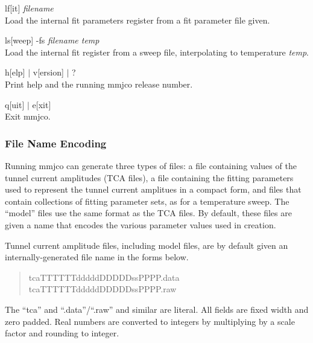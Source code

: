 {\begin{description}
\item{{\vt lf}[{\vt it}] {\it filename}\\
Load the internal fit parameters register from a fit parameter file
given.}

\item{{\vt ls}[{\vt weep}] {\vt -fs} {\it filename temp}\\
Load the internal fit register from a sweep file, interpolating to
temperature {\it temp}.}

\item{{\vt h}[{\vt elp}] $|$ {\vt v}[{\vt ersion}] $|$ ?\\
Print help and the running mmjco release number.}

\item{{\vt q}[{\vt uit}] $|$ {\vt e}[{\vt xit}]\\
Exit {\vt mmjco}.}
\end{description}

\subsubsection{File Name Encoding}

Running {\vt mmjco} can generate three types of files:  a file
containing values of the tunnel current amplitudes (TCA files), a file
containing the fitting parameters used to represent the tunnel current
amplitues in a compact form, and files that contain collections of
fitting parameter sets, as for a temperature sweep.  The ``model''
files use the same format as the TCA files.  By default, these files
are given a name that encodes the various parameter values used in
creation.

Tunnel current amplitude files, including model files, are by default
given an internally-generated file name in the forms below.
\begin{quote}\vt
tcaTTTTTTdddddDDDDDssPPPP.data\\
tcaTTTTTTdddddDDDDDssPPPP.raw
\end{quote}

The ``{\vt tca}'' and ``{\vt .data}''/``{\vt .raw}'' and similar are
literal.  All fields are fixed width and zero padded.  Real numbers
are converted to integers by multiplying by a scale factor and
rounding to integer.

}
